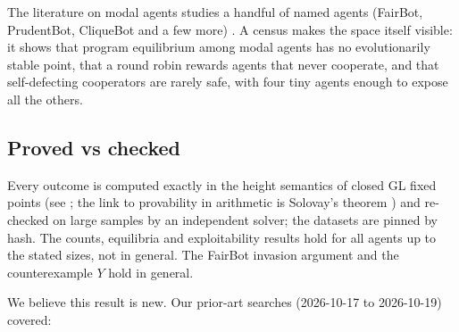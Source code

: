 \documentclass{article}
\begin{document}
The literature on modal agents studies a handful of named agents (FairBot, PrudentBot, CliqueBot
and a few more) \cite{barasz2014robust,lavictoire2014program}. A census makes the space itself
visible: it shows that program equilibrium among modal agents has no evolutionarily stable
point, that a round robin rewards agents that never cooperate, and that self-defecting
cooperators are rarely safe, with four tiny agents enough to expose all the others.

\subsection*{Proved vs checked}

Every outcome is computed exactly in the height semantics of closed GL fixed points (see
\cite{boolos1993logic}; the link to provability in arithmetic is Solovay's theorem
\cite{solovay1976provability}) and re-checked on large samples by an independent solver; the
datasets are pinned by hash. The counts, equilibria and exploitability results hold for all
agents up to the stated sizes, not in general. The FairBot invasion argument and the
counterexample $Y$ hold in general.

We believe this result is new. Our prior-art searches (2026-10-17 to 2026-10-19) covered:
\end{document}
